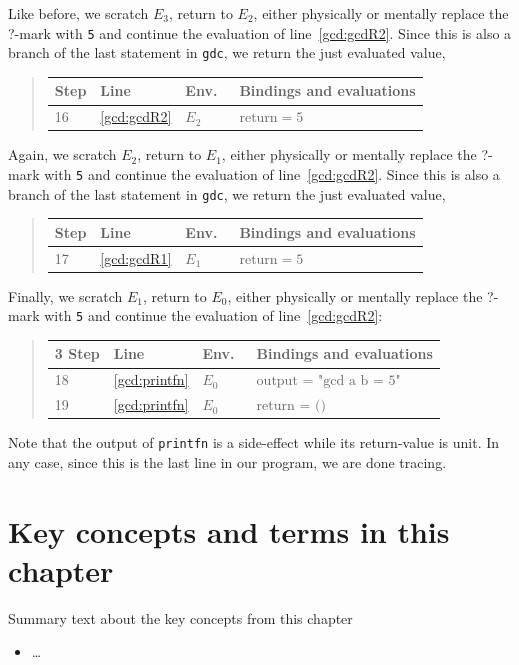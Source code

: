 \documentclass[springer.tex]{subfiles}
\begin{document}
Like before, we scratch $E_3$, return to $E_2$, either physically or mentally replace the ?-mark with \lstinline!5! and continue the evaluation of line~\ref{gcd:gcdR2}. Since this is also a branch of the last statement in \lstinline{gdc}, we return the just evaluated value,
\begin{quote}
  \begin{tabular*}{0.6\linewidth}{l|lll}
    Step & Line & Env.\ & Bindings and evaluations\\
    \hline
    16&\ref{gcd:gcdR2} & $E_2$ & $\text{return} = 5$\\
  \end{tabular*}
\end{quote}
Again, we scratch $E_2$, return to $E_1$, either physically or mentally replace the ?-mark with \lstinline!5! and continue the evaluation of line~\ref{gcd:gcdR2}. Since this is also a branch of the last statement in \lstinline{gdc}, we return the just evaluated value,
\begin{quote}
  \begin{tabular*}{0.6\linewidth}{l|lll}
    Step & Line & Env.\ & Bindings and evaluations\\
    \hline
    17&\ref{gcd:gcdR1} & $E_1$ & $\text{return} = 5$\\
  \end{tabular*}
\end{quote}
Finally, we scratch $E_1$, return to $E_0$, either physically or mentally replace the ?-mark with \lstinline!5! and continue the evaluation of line~\ref{gcd:gcdR2}:
\begin{quote}
  \begin{tabular*}{0.6\linewidth}{l|lll}3
    Step & Line & Env.\ & Bindings and evaluations\\
    \hline
    18 & \ref{gcd:printfn} & $E_0$ & $\text{output = "gcd a b = 5"}$\\
    19 & \ref{gcd:printfn} & $E_0$ & $\text{return = ()}$\\
  \end{tabular*}
\end{quote}
Note that the output of \lstinline{printfn} is a side-effect while its return-value is unit. In any case, since this is the last line in our program, we are done tracing.

\section{Key concepts and terms in this chapter}
Summary text about the key concepts from this chapter
\begin{itemize}
\item \ldots
\end{itemize}
\end{document}
